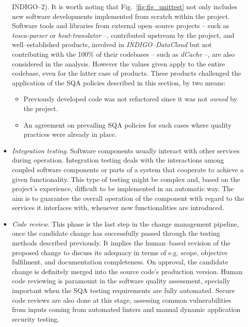 \begin{itemize}
INDIGO--2). It is worth noting that Fig.~\ref{fig:fig_unittest} not only includes new software developments
implemented from scratch within the project. Software tools and libraries from
external open--source projects -- such as {\sl tosca-parser} or {\sl heat-translator} --, contributed upstream
by the project, and well--established products, involved in {\sl INDIGO--DataCloud}
but not contributing with the 100\% of their codebases -- such as {\sl dCache} --, are also considered in the
analysis. However the values given apply to the entire codebase, even for the latter case of products. These
products challenged the application of the SQA policies described in this section, by two means:
\begin{itemize}
    \item Previously developed code was not refactored since it was not \textit{owned} by the project.
    \item An agreement on prevailing SQA policies for such cases where quality practices were already in place.
\end{itemize}

\item \textit{Integration testing}. Software components usually interact with other services during
operation. Integration testing deals with the interactions among coupled software components or
parts of a system that cooperate to achieve a given functionality. This type of testing might be
complex and, based on the project's experience, difficult to be implemented in an automatic way. The aim is to
guarantee the overall operation of the component with regard to the services it interfaces with,
whenever new functionalities are introduced.

\item \textit{Code review}.
This phase is the last step in the change management pipeline, once the candidate change has
successfully passed through the testing methods described previously. It implies the human--based
revision of the proposed change to discuss its adequacy in terms of e.g. scope, objective fulfilment,
and documentation completeness. On approval, the candidate change is definitely merged into
the source code's production version. Human code reviewing is paramount in the software quality assessment, specially
important when the SQA testing requirements are fully automated. Secure code reviews are also
done at this stage, assessing common vulnerabilities from inputs coming from automated linters
and manual dynamic application security testing.


\end{itemize}
